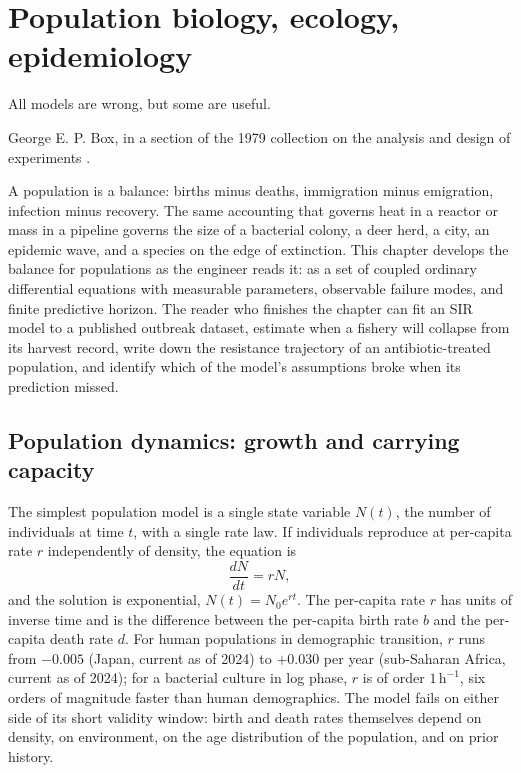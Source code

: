 \chapter{Population biology, ecology, epidemiology}
\label{vol06:ch08}

\epigraph{All models are wrong, but some are useful.}{George E. P.
Box, in a section of the 1979 collection on the analysis and design
of experiments \cite[p.~202]{paper:v6c08-box-1979}.}


\noindent
A population is a balance: births minus deaths, immigration minus
emigration, infection minus recovery. The same accounting that
governs heat in a reactor or mass in a pipeline governs the size of
a bacterial colony, a deer herd, a city, an epidemic wave, and a
species on the edge of extinction. This chapter develops the
balance for populations as the engineer reads it: as a set of
coupled ordinary differential equations with measurable parameters,
observable failure modes, and finite predictive horizon. The reader
who finishes the chapter can fit an SIR model to a published outbreak
dataset, estimate when a fishery will collapse from its harvest
record, write down the resistance trajectory of an antibiotic-treated
population, and identify which of the model's assumptions broke when
its prediction missed.

\section{Population dynamics: growth and carrying capacity}

The simplest population model is a single state variable $N(t)$, the
number of individuals at time $t$, with a single rate law. If
individuals reproduce at per-capita rate $r$ independently of
density, the equation is
\[
\frac{dN}{dt} = r N,
\]
and the solution is exponential, $N(t) = N_0 e^{r t}$. The
per-capita rate $r$ has units of inverse time and is the difference
between the per-capita birth rate $b$ and the per-capita death rate
$d$. For human populations in demographic transition, $r$ runs from
$-0.005$ (Japan, current as of 2024) to $+0.030$
per year (sub-Saharan Africa, current as of 2024); for a bacterial
culture in log phase, $r$ is of order $1\,\text{h}^{-1}$, six orders
of magnitude faster than human demographics. The model fails on
either side of its short validity window: birth and death rates
themselves depend on density, on environment, on the age distribution
of the population, and on prior history.

